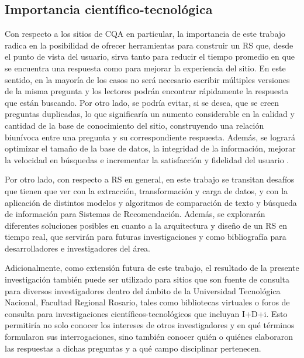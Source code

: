 \subsection{Importancia científico-tecnológica}
Con respecto a los sitios de CQA en particular, la importancia de este trabajo radica en la posibilidad de ofrecer herramientas para construir un RS que, desde el punto de vista del usuario, sirva tanto para reducir el tiempo promedio en que se encuentra una respuesta como para mejorar la experiencia del sitio. En este sentido, en la mayoría de los casos no será necesario escribir múltiples versiones de la misma pregunta y los lectores podrán encontrar rápidamente la respuesta que están buscando. Por otro lado, se podría evitar, si se desea, que se creen preguntas duplicadas, lo que significaría un aumento considerable en la calidad y cantidad de la base de conocimiento del sitio, construyendo una relación biunívoca entre una pregunta y su correspondiente respuesta. Además, se logrará optimizar el tamaño de la base de datos, la integridad de la información, mejorar la velocidad en búsquedas e incrementar la satisfacción y fidelidad del usuario \citep{ricci2011introduction}.

\bigskip Por otro lado, con respecto a RS en general, en este trabajo se transitan desafíos que tienen que ver con la extracción, transformación y carga de datos, y con la aplicación de distintos modelos y algoritmos de comparación de texto y búsqueda de información para Sistemas de Recomendación. Además, se explorarán diferentes soluciones posibles en cuanto a la arquitectura y diseño de un RS en tiempo real, que servirán para futuras investigaciones y como bibliografía para desarrolladores e investigadores del área.

\bigskip Adicionalmente, como extensión futura de este trabajo, el resultado de la presente investigación también puede ser utilizado para sitios que son fuente de consulta para diversos investigadores dentro del ámbito de la Universidad Tecnológica Nacional, Facultad Regional Rosario, tales como bibliotecas virtuales o foros de consulta para investigaciones científicos-tecnológicos que incluyan I+D+i. Esto permitiría no solo conocer los intereses de otros investigadores y en qué términos formularon sus interrogaciones, sino también conocer quién o quiénes elaboraron las respuestas a dichas preguntas y a qué campo disciplinar pertenecen.



